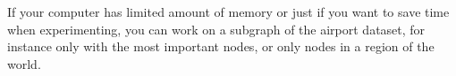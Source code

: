 \documentclass[addpoints]{exam}
\begin{document}
\begin{center}
\end{center}



\begin{tcolorbox}[colback=black!5!white,colframe=white!75!black]
If your computer has limited amount of memory or just if you want to save time when experimenting, you can work on a subgraph of the airport dataset, for instance only with the most important nodes, or only nodes in a region of the world.
\end{tcolorbox}
\end{document}
